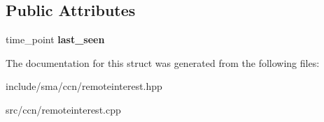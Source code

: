\subsection*{Public Attributes}
\begin{DoxyCompactItemize}
\item 
\hypertarget{structsma_1_1RemoteInterest_a34ef04be51e775542d74f227161b3871}{time\-\_\-point {\bfseries last\-\_\-seen}}\label{structsma_1_1RemoteInterest_a34ef04be51e775542d74f227161b3871}

\end{DoxyCompactItemize}


The documentation for this struct was generated from the following files\-:\begin{DoxyCompactItemize}
\item 
include/sma/ccn/remoteinterest.\-hpp\item 
src/ccn/remoteinterest.\-cpp\end{DoxyCompactItemize}

